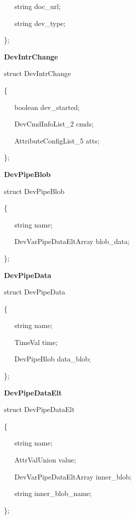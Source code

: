 ~~~string doc\_url;

~~~string dev\_type;

\};\\


\begin{flushleft}
\textbf{DevIntrChange}
\par\end{flushleft}

struct DevIntrChange

\{

~~~boolean dev\_started;

~~~DevCmdInfoList\_2 cmds;

~~~AttributeConfigList\_5 atts;

\};\\


\begin{flushleft}
\textbf{DevPipeBlob}
\par\end{flushleft}

struct DevPipeBlob

\{

~~~string name;

~~~DevVarPipeDataEltArray blob\_data;

\};\\


\begin{flushleft}
\textbf{DevPipeData}
\par\end{flushleft}

struct DevPipeData

\{

~~~string name;

~~~TimeVal time;

~~~DevPipeBlob data\_blob;

\};\\


\begin{flushleft}
\textbf{DevPipeDataElt}
\par\end{flushleft}

struct DevPipeDataElt

\{

~~~string name;

~~~AttrValUnion value;

~~~DevVarPipeDataEltArray inner\_blob;

~~~string inner\_blob\_name;

\};\\


